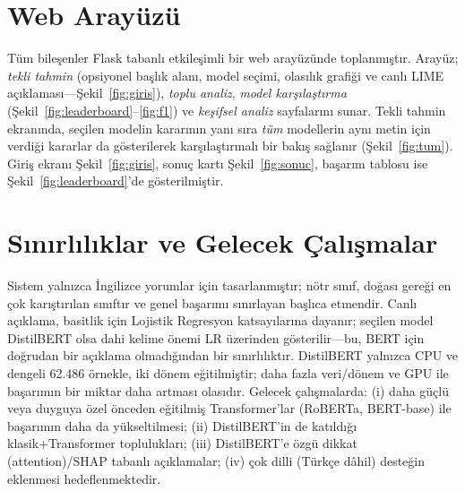 \documentclass[conference]{IEEEtran}
\begin{document}
\section{Web Arayüzü}
Tüm bileşenler Flask tabanlı etkileşimli bir web arayüzünde toplanmıştır.
Arayüz; \emph{tekli tahmin} (opsiyonel başlık alanı, model seçimi, olasılık
grafiği ve canlı LIME açıklaması---Şekil~\ref{fig:giris}), \emph{toplu analiz},
\emph{model karşılaştırma} (Şekil~\ref{fig:leaderboard}--\ref{fig:f1}) ve
\emph{keşifsel analiz} sayfalarını sunar. Tekli tahmin ekranında, seçilen modelin
kararının yanı sıra \emph{tüm} modellerin aynı metin için verdiği kararlar da
gösterilerek karşılaştırmalı bir bakış sağlanır (Şekil~\ref{fig:tum}). Giriş ekranı
Şekil~\ref{fig:giris}, sonuç kartı Şekil~\ref{fig:sonuc}, başarım tablosu ise
Şekil~\ref{fig:leaderboard}'de gösterilmiştir.

\section{Sınırlılıklar ve Gelecek Çalışmalar}
Sistem yalnızca İngilizce yorumlar için tasarlanmıştır; nötr sınıf, doğası gereği
en çok karıştırılan sınıftır ve genel başarımı sınırlayan başlıca etmendir. Canlı
açıklama, basitlik için Lojistik Regresyon katsayılarına dayanır; seçilen model
DistilBERT olsa dahi kelime önemi LR üzerinden gösterilir---bu, BERT için doğrudan
bir açıklama olmadığından bir sınırlılıktır. DistilBERT yalnızca CPU ve dengeli
62.486 örnekle, iki dönem eğitilmiştir; daha fazla veri/dönem ve GPU ile başarımın
bir miktar daha artması olasıdır. Gelecek çalışmalarda: (i) daha güçlü veya duyguya
özel önceden eğitilmiş Transformer'lar (RoBERTa, BERT-base) ile başarımın daha da
yükseltilmesi; (ii) DistilBERT'in de katıldığı klasik+Transformer toplulukları;
(iii) DistilBERT'e özgü dikkat (attention)/SHAP tabanlı açıklamalar; (iv) çok dilli
(Türkçe dâhil) desteğin eklenmesi hedeflenmektedir.

\end{document}
